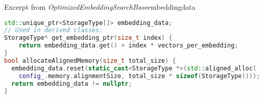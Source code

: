 \begin{algorithm}{Excerpt from \textit{OptimizedEmbeddingSearchBase}}{embeddingdata}
    \begin{lstlisting}[language=C++]
std::unique_ptr<StorageType[]> embedding_data;
// Used in derived classes:
StorageType* get_embedding_ptr(size_t index) {
    return embedding_data.get() + index * vectors_per_embedding;
}
bool allocateAlignedMemory(size_t total_size) {
  embedding_data.reset(static_cast<StorageType *>(std::aligned_alloc(
    config_.memory.alignmentSize, total_size * sizeof(StorageType))));
  return embedding_data != nullptr;
}
\end{lstlisting}
\end{algorithm}